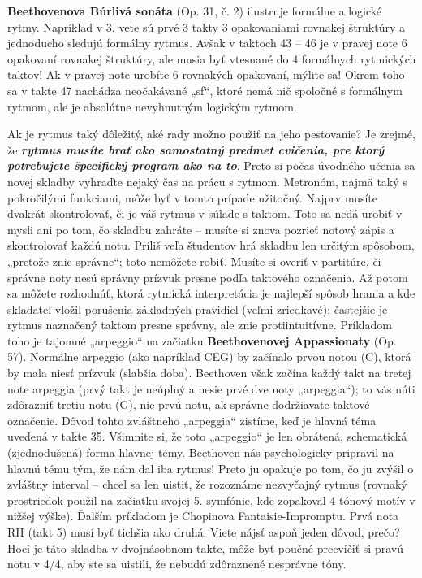 \documentclass[11pt,a4paper%
]{book}
\begin{document}
\textbf{Beethovenova Búrlivá sonáta} (Op. 31, č. 2) ilustruje formálne a logické rytmy. Napríklad v 3. vete sú prvé 3 takty 3 opakovaniami rovnakej štruktúry a jednoducho sledujú formálny rytmus. Avšak v taktoch 43 -- 46 je v pravej note 6 opakovaní rovnakej štruktúry, ale musia byť vtesnané do 4 formálnych rytmických taktov! Ak v pravej note urobíte 6 rovnakých opakovaní, mýlite sa! Okrem toho sa v takte 47 nachádza neočakávané „sf``, ktoré nemá nič spoločné s formálnym rytmom, ale je absolútne nevyhnutným logickým rytmom.

Ak je rytmus taký dôležitý, aké rady možno použiť na jeho pestovanie? Je zrejmé, že \emph{\textbf{rytmus musíte brať ako samostatný predmet cvičenia, pre ktorý potrebujete špecifický program ako na to}}. Preto si počas úvodného učenia sa novej skladby vyhraďte nejaký čas na prácu s rytmom. Metronóm, najmä taký s pokročilými funkciami, môže byť v tomto prípade užitočný. Najprv musíte dvakrát skontrolovať, či je váš rytmus v súlade s taktom. Toto sa nedá urobiť v mysli ani po tom, čo skladbu zahráte -- musíte si znova pozrieť notový zápis a skontrolovať každú notu. Príliš veľa študentov hrá skladbu len určitým spôsobom, „pretože znie správne``; toto nemôžete robiť. Musíte si overiť v partitúre, či správne noty nesú správny prízvuk presne podľa taktového označenia. Až potom sa môžete rozhodnúť, ktorá rytmická interpretácia je najlepší spôsob hrania a kde skladateľ vložil porušenia základných pravidiel (veľmi zriedkavé); častejšie je rytmus naznačený taktom presne správny, ale znie protiintuitívne. Príkladom toho je tajomné „arpeggio`` na začiatku \textbf{Beethovenovej Appassionaty} (Op. 57). Normálne arpeggio (ako napríklad CEG) by začínalo prvou notou (C), ktorá by mala niesť prízvuk (slabšia doba). Beethoven však začína každý takt na tretej note arpeggia (prvý takt je neúplný a nesie prvé dve noty „arpeggia``); to vás núti zdôrazniť tretiu notu (G), nie prvú notu, ak správne dodržiavate taktové označenie. Dôvod tohto zvláštneho „arpeggia`` zistíme, keď je hlavná téma uvedená v takte 35. Všimnite si, že toto „arpeggio`` je len obrátená, schematická (zjednodušená) forma hlavnej témy. Beethoven nás psychologicky pripravil na hlavnú tému tým, že nám dal iba rytmus! Preto ju opakuje po tom, čo ju zvýšil o zvláštny interval -- chcel sa len uistiť, že rozoznáme nezvyčajný rytmus (rovnaký prostriedok použil na začiatku svojej 5. symfónie, kde zopakoval 4-tónový motív v nižšej výške). Ďalším príkladom je Chopinova Fantaisie-Impromptu. Prvá nota RH (takt 5) musí byť tichšia ako druhá. Viete nájsť aspoň jeden dôvod, prečo? Hoci je táto skladba v dvojnásobnom takte, môže byť poučné precvičiť si pravú notu v 4/4, aby ste sa uistili, že nebudú zdôraznené nesprávne tóny.
\end{document}
